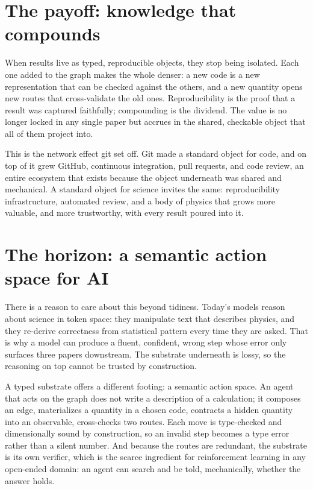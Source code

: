\documentclass[11pt,a4paper]{article}
\begin{document}
\medskip
{}

\section{The payoff: knowledge that compounds}

When results live as typed, reproducible objects, they stop being isolated. Each
one added to the graph makes the whole denser: a new code is a new representation
that can be checked against the others, and a new quantity opens new routes that
cross-validate the old ones. Reproducibility is the proof that a result was
captured faithfully; compounding is the dividend. The value is no longer locked in
any single paper but accrues in the shared, checkable object that all of them
project into.

This is the network effect git set off. Git made a standard object for code, and
on top of it grew GitHub, continuous integration, pull requests, and code review,
an entire ecosystem that exists because the object underneath was shared and
mechanical. A standard object for science invites the same: reproducibility
infrastructure, automated review, and a body of physics that grows more valuable,
and more trustworthy, with every result poured into it.

\section{The horizon: a semantic action space for AI}

There is a reason to care about this beyond tidiness. Today's models reason about
science in token space: they manipulate text that describes physics, and they
re-derive correctness from statistical pattern every time they are asked. That is
why a model can produce a fluent, confident, wrong step whose error only surfaces
three papers downstream. The substrate underneath is lossy, so the reasoning on
top cannot be trusted by construction.

A typed substrate offers a different footing: a semantic action space. An agent
that acts on the graph does not write a description of a calculation; it composes
an edge, materializes a quantity in a chosen code, contracts a hidden quantity into
an observable, cross-checks two routes. Each move is type-checked and dimensionally
sound by construction, so an invalid step becomes a type error rather than a silent
number. And because the routes are redundant, the substrate is its own verifier,
which is the scarce ingredient for reinforcement learning in any open-ended domain:
an agent can search and be told, mechanically, whether the answer holds.
\end{document}
